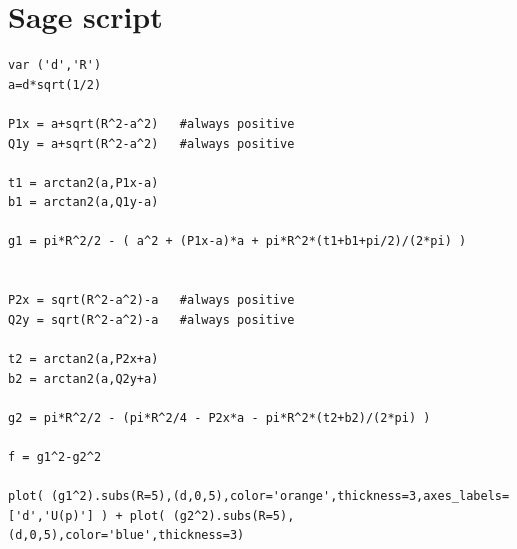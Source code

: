 \section{Sage script}

\begin{lstlisting}
var ('d','R')
a=d*sqrt(1/2)

P1x = a+sqrt(R^2-a^2)	#always positive
Q1y = a+sqrt(R^2-a^2)	#always positive

t1 = arctan2(a,P1x-a)
b1 = arctan2(a,Q1y-a)

g1 = pi*R^2/2 - ( a^2 + (P1x-a)*a + pi*R^2*(t1+b1+pi/2)/(2*pi) )


P2x = sqrt(R^2-a^2)-a	#always positive
Q2y = sqrt(R^2-a^2)-a	#always positive

t2 = arctan2(a,P2x+a)
b2 = arctan2(a,Q2y+a)

g2 = pi*R^2/2 - (pi*R^2/4 - P2x*a - pi*R^2*(t2+b2)/(2*pi) )

f = g1^2-g2^2

plot( (g1^2).subs(R=5),(d,0,5),color='orange',thickness=3,axes_labels=['d','U(p)'] ) + plot( (g2^2).subs(R=5),(d,0,5),color='blue',thickness=3)
\end{lstlisting}